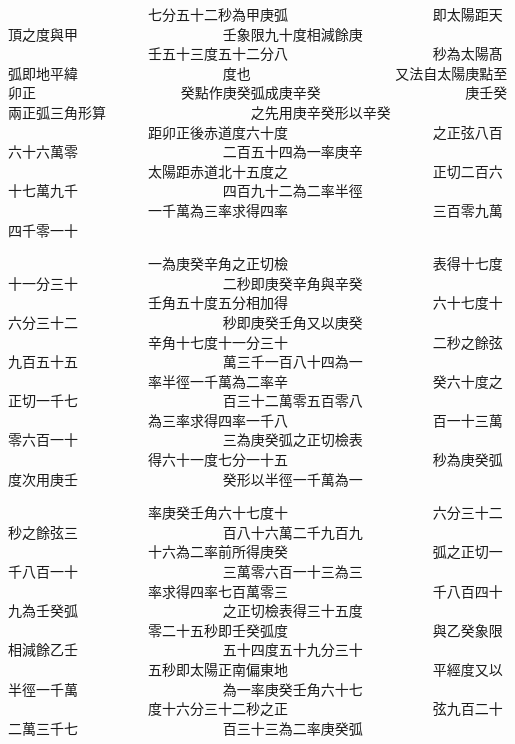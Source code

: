 \begin{正文}
　　　　　　　　　　七分五十二秒為甲庚弧
　　　　　　　　　　即太陽距天頂之度與甲
　　　　　　　　　　壬象限九十度相減餘庚
　　　　　　　　　　壬五十三度五十二分八
　　　　　　　　　　秒為太陽髙弧即地平緯
　　　　　　　　　　度也
　　　　　　　　　　又法自太陽庚點至卯正
　　　　　　　　　　癸點作庚癸弧成庚辛癸
　　　　　　　　　　庚壬癸兩正弧三角形算
　　　　　　　　　　之先用庚辛癸形以辛癸
　　　　　　　　　　距卯正後赤道度六十度
　　　　　　　　　　之正弦八百六十六萬零
　　　　　　　　　　二百五十四為一率庚辛
　　　　　　　　　　太陽距赤道北十五度之
　　　　　　　　　　正切二百六十七萬九千
　　　　　　　　　　四百九十二為二率半徑
　　　　　　　　　　一千萬為三率求得四率
　　　　　　　　　　三百零九萬四千零一十
\par
\end{正文}\clearpage
{}
\begin{正文}
　　　　　　　　　　一為庚癸辛角之正切檢
　　　　　　　　　　表得十七度十一分三十
　　　　　　　　　　二秒即庚癸辛角與辛癸
　　　　　　　　　　壬角五十度五分相加得
　　　　　　　　　　六十七度十六分三十二
　　　　　　　　　　秒即庚癸壬角又以庚癸
　　　　　　　　　　辛角十七度十一分三十
　　　　　　　　　　二秒之餘弦九百五十五
　　　　　　　　　　萬三千一百八十四為一
　　　　　　　　　　率半徑一千萬為二率辛
　　　　　　　　　　癸六十度之正切一千七
　　　　　　　　　　百三十二萬零五百零八
　　　　　　　　　　為三率求得四率一千八
　　　　　　　　　　百一十三萬零六百一十
　　　　　　　　　　三為庚癸弧之正切檢表
　　　　　　　　　　得六十一度七分一十五
　　　　　　　　　　秒為庚癸弧度次用庚壬
　　　　　　　　　　癸形以半徑一千萬為一
\par
\end{正文}\clearpage
{}
\begin{正文}
　　　　　　　　　　率庚癸壬角六十七度十
　　　　　　　　　　六分三十二秒之餘弦三
　　　　　　　　　　百八十六萬二千九百九
　　　　　　　　　　十六為二率前所得庚癸
　　　　　　　　　　弧之正切一千八百一十
　　　　　　　　　　三萬零六百一十三為三
　　　　　　　　　　率求得四率七百萬零三
　　　　　　　　　　千八百四十九為壬癸弧
　　　　　　　　　　之正切檢表得三十五度
　　　　　　　　　　零二十五秒即壬癸弧度
　　　　　　　　　　與乙癸象限相減餘乙壬
　　　　　　　　　　五十四度五十九分三十
　　　　　　　　　　五秒即太陽正南偏東地
　　　　　　　　　　平經度又以半徑一千萬
　　　　　　　　　　為一率庚癸壬角六十七
　　　　　　　　　　度十六分三十二秒之正
　　　　　　　　　　弦九百二十二萬三千七
　　　　　　　　　　百三十三為二率庚癸弧
\par
\end{正文}\clearpage
